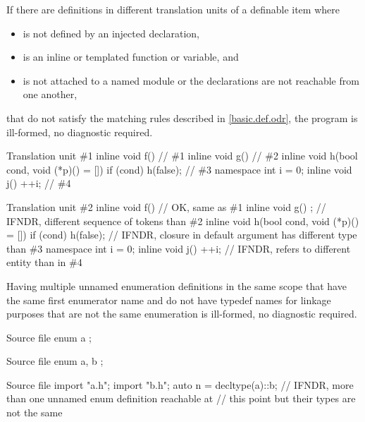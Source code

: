 
\pnum
If there are definitions
in different translation units
of a definable item 
where
\begin{itemize}
\item {} is not defined by an injected declaration,
\item {} is an inline or templated function or variable, and
\item {} is not attached to a named module or the declarations are not reachable from one another,
\end{itemize}
that do not satisfy the matching rules described in \ref{basic.def.odr},
the program is ill-formed, no diagnostic required.

\pnum
\begin{example}
\begin{codeblocktu}{Translation unit \#1}
inline void f() {}                                      // \#1
inline void g() {}                                      // \#2
inline void h(bool cond, void (*p)() = []{}) {
  if (cond) h(false);
}                                                       // \#3
namespace { int i = 0; }
inline void j() {++i;}                                  // \#4
\end{codeblocktu}
\begin{codeblocktu}{Translation unit \#2}
inline void f() {}          // OK, same as \#1
inline void g() {;}         // IFNDR, different sequence of tokens than \#2
inline void h(bool cond, void (*p)() = []{}) {
  if (cond) h(false);
}                           // IFNDR, closure in default argument has different type than \#3
namespace { int i = 0; }
inline void j() {++i; }     // IFNDR,  refers to different entity than in \#4
\end{codeblocktu}
\end{example}


\pnum
Having multiple unnamed enumeration definitions
in the same scope
that have the same first enumerator name
and do not have typedef names for linkage purposes
that are not the same enumeration
is ill-formed, no diagnostic required.

\pnum
\begin{example}
\begin{codeblocktu}{Source file }
enum { a };
\end{codeblocktu}
\begin{codeblocktu}{Source file }
enum { a, b };
\end{codeblocktu}
\begin{codeblocktu}{Source file }
import "a.h";
import "b.h";
auto n = decltype(a)::b;        // IFNDR, more than one unnamed enum definition reachable at
                                // this point but their types are not the same
\end{codeblocktu}
\end{example}

